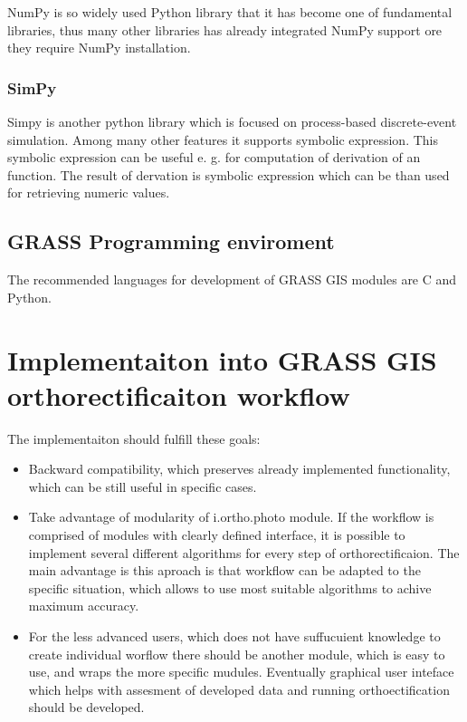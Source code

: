 \documentclass[a4paper,12pt]{report}
\begin{document}
NumPy is so widely used Python library that it has become one of fundamental libraries, thus many
other libraries has already integrated NumPy support ore they require NumPy installation.

\subsubsection{SimPy}

Simpy is another python library which is focused on process-based discrete-event simulation.
Among many other features it supports symbolic expression. This symbolic expression can be useful
e. g. for computation of derivation of an function. The result of dervation is symbolic expression which can 
be than used for retrieving numeric values. 

\subsection{GRASS Programming  enviroment}

The recommended languages for development of GRASS GIS modules are C and Python.




\section{Implementaiton into GRASS GIS orthorectificaiton workflow}

The implementaiton should fulfill these goals:

\begin{itemize}
\item Backward compatibility, which preserves already implemented functionality, which
can be still useful in specific cases. 
\item Take advantage of modularity of i.ortho.photo module.
If the workflow is comprised of modules with clearly defined interface, it is possible to implement
several different algorithms for every step of orthorectificaion. The main advantage is this 
aproach is that workflow can be adapted to the specific situation, which allows to use 
most suitable algorithms to achive maximum accuracy.
\item For the less advanced users, which does not have suffucuient knowledge to create individual 
worflow there should be another module, which is easy to use, and wraps the more specific mudules.
Eventually graphical user inteface which helps with assesment of developed data and running orthoectification
should be developed. 
\end{itemize}
\end{document}
